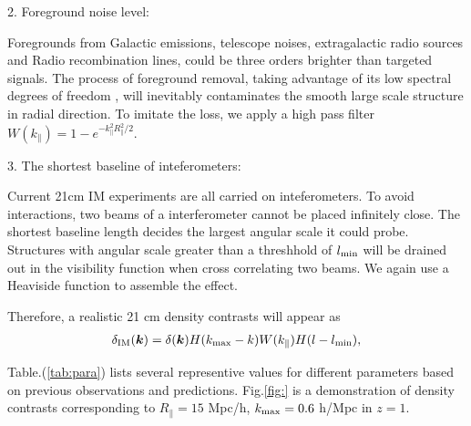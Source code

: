 2. Foreground noise level:

Foregrounds from Galactic emissions, telescope noises, 
extragalactic radio sources and Radio recombination lines, 
could be three orders brighter than targeted signals\cite{DiMatteo04,Masui13}. 
The process of foreground removal, taking advantage of its low spectral
degrees of freedom \cite{Switzer15}, 
will inevitably contaminates the smooth large scale structure in radial direction.  
To imitate the loss, we apply a high pass filter $W(k_\parallel)=1-e^{-k_\parallel^2R_\parallel^2/2}$. 

3. The shortest baseline of inteferometers:

Current 21cm IM experiments are all carried on inteferometers. 
To avoid interactions, two beams of a interferometer 
cannot be placed infinitely close. 
The shortest baseline length decides the largest 
angular scale it could probe.  
Structures with angular scale greater than a threshhold of 
$l_\mathrm{min}$ will be drained out 
in the visibility function 
when cross correlating two beams. 
We again use a Heaviside function to assemble the effect. 

Therefore, a realistic 21 cm density contrasts will appear as 
\begin{eqnarray}
\label{eq:ns}
    \delta_\mathrm{IM}(\bm{k})=\delta(\bm{k})H(k_\mathrm{max}-k)W(k_\parallel)H(l-l_\mathrm{min}),
\end{eqnarray}

Table.(\ref{tab:para}) 
lists several representive values for different parameters 
based on previous observations and predictions. 
Fig.\ref{fig:} 
is a demonstration of density contrasts corresponding to 
$R_\parallel=15$ Mpc/h, $k_\mathrm{max}=0.6$ h/Mpc 
in $z=1$. 

